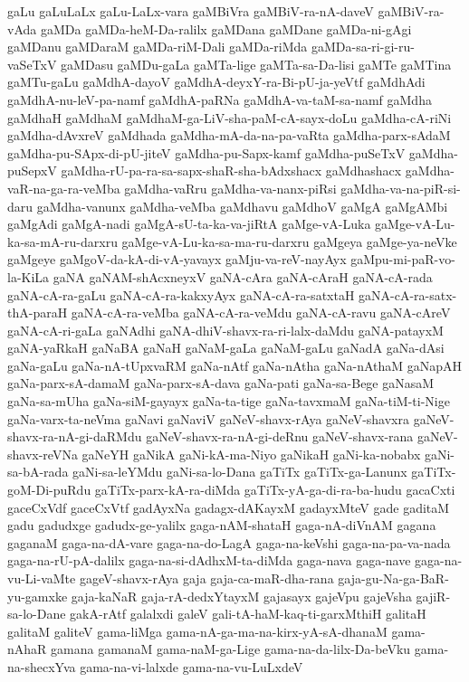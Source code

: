 {gaLu
gaLuLaLx
gaLu-LaLx-vara
gaMBiVra
gaMBiV-ra-nA-daveV
gaMBiV-ra-vAda
gaMDa
gaMDa-heM-Da-ralilx
gaMDana
gaMDane
gaMDa-ni-gAgi
gaMDanu
gaMDaraM
gaMDa-riM-Dali
gaMDa-riMda
gaMDa-sa-ri-gi-ru-vaSeTxV
gaMDasu
gaMDu-gaLa
gaMTa-lige
gaMTa-sa-Da-lisi
gaMTe
gaMTina
gaMTu-gaLu
gaMdhA-dayoV
gaMdhA-deyxY-ra-Bi-pU-ja-yeVtf
gaMdhAdi
gaMdhA-nu-leV-pa-namf
gaMdhA-paRNa
gaMdhA-va-taM-sa-namf
gaMdha
gaMdhaH
gaMdhaM
gaMdhaM-ga-LiV-sha-paM-cA-sayx-doLu
gaMdha-cA-riNi
gaMdha-dAvxreV
gaMdhada
gaMdha-mA-da-na-pa-vaRta
gaMdha-parx-sAdaM
gaMdha-pu-SApx-di-pU-jiteV
gaMdha-pu-Sapx-kamf
gaMdha-puSeTxV
gaMdha-puSepxV
gaMdha-rU-pa-ra-sa-sapx-shaR-sha-bAdxshacx
gaMdhashacx
gaMdha-vaR-na-ga-ra-veMba
gaMdha-vaRru
gaMdha-va-nanx-piRsi
gaMdha-va-na-piR-si-daru
gaMdha-vanunx
gaMdha-veMba
gaMdhavu
gaMdhoV
gaMgA
gaMgAMbi
gaMgAdi
gaMgA-nadi
gaMgA-sU-ta-ka-va-jiRtA
gaMge-vA-Luka
gaMge-vA-Lu-ka-sa-mA-ru-darxru
gaMge-vA-Lu-ka-sa-ma-ru-darxru
gaMgeya
gaMge-ya-neVke
gaMgeye
gaMgoV-da-kA-di-vA-yavayx
gaMju-va-reV-nayAyx
gaMpu-mi-paR-vo-la-KiLa
gaNA
gaNAM-shAcxneyxV
gaNA-cAra
gaNA-cAraH
gaNA-cA-rada
gaNA-cA-ra-gaLu
gaNA-cA-ra-kakxyAyx
gaNA-cA-ra-satxtaH
gaNA-cA-ra-satx-thA-paraH
gaNA-cA-ra-veMba
gaNA-cA-ra-veMdu
gaNA-cA-ravu
gaNA-cAreV
gaNA-cA-ri-gaLa
gaNAdhi
gaNA-dhiV-shavx-ra-ri-lalx-daMdu
gaNA-patayxM
gaNA-yaRkaH
gaNaBA
gaNaH
gaNaM-gaLa
gaNaM-gaLu
gaNadA
gaNa-dAsi
gaNa-gaLu
gaNa-nA-tUpxvaRM
gaNa-nAtf
gaNa-nAtha
gaNa-nAthaM
gaNapAH
gaNa-parx-sA-damaM
gaNa-parx-sA-dava
gaNa-pati
gaNa-sa-Bege
gaNasaM
gaNa-sa-mUha
gaNa-siM-gayayx
gaNa-ta-tige
gaNa-tavxmaM
gaNa-tiM-ti-Nige
gaNa-varx-ta-neVma
gaNavi
gaNaviV
gaNeV-shavx-rAya
gaNeV-shavxra
gaNeV-shavx-ra-nA-gi-daRMdu
gaNeV-shavx-ra-nA-gi-deRnu
gaNeV-shavx-rana
gaNeV-shavx-reVNa
gaNeYH
gaNikA
gaNi-kA-ma-Niyo
gaNikaH
gaNi-ka-nobabx
gaNi-sa-bA-rada
gaNi-sa-leYMdu
gaNi-sa-lo-Dana
gaTiTx
gaTiTx-ga-Lanunx
gaTiTx-goM-Di-puRdu
gaTiTx-parx-kA-ra-diMda
gaTiTx-yA-ga-di-ra-ba-hudu
gacaCxti
gaceCxVdf
gaceCxVtf
gadAyxNa
gadagx-dAKayxM
gadayxMteV
gade
gaditaM
gadu
gadudxge
gadudx-ge-yalilx
gaga-nAM-shataH
gaga-nA-diVnAM
gagana
gaganaM
gaga-na-dA-vare
gaga-na-do-LagA
gaga-na-keVshi
gaga-na-pa-va-nada
gaga-na-rU-pA-dalilx
gaga-na-si-dAdhxM-ta-diMda
gaga-nava
gaga-nave
gaga-na-vu-Li-vaMte
gageV-shavx-rAya
gaja
gaja-ca-maR-dha-rana
gaja-gu-Na-ga-BaR-yu-gamxke
gaja-kaNaR
gaja-rA-dedxYtayxM
gajasayx
gajeVpu
gajeVsha
gajiR-sa-lo-Dane
gakA-rAtf
galalxdi
galeV
gali-tA-haM-kaq-ti-garxMthiH
galitaH
galitaM
galiteV
gama-liMga
gama-nA-ga-ma-na-kirx-yA-sA-dhanaM
gama-nAhaR
gamana
gamanaM
gama-naM-ga-Lige
gama-na-da-lilx-Da-beVku
gama-na-shecxYva
gama-na-vi-lalxde
gama-na-vu-LuLxdeV
}
